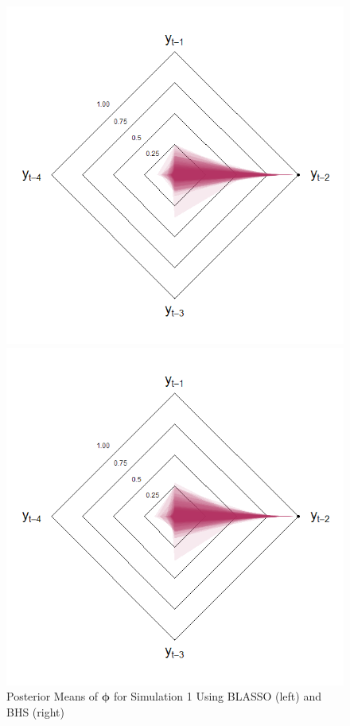 \begin{figure}[!h]
\centering
\caption{Posterior Means of $\bm{\phi}$ for Simulation 1 Using BLASSO (left) and BHS (right)}
\begin{minipage}[h]{0.4\textwidth}
\includegraphics[scale=0.32]{blassodlp}
\end{minipage} \hspace{0.10\textwidth}
\begin{minipage}[h]{0.4\textwidth}
\includegraphics[scale=0.32]{hsdlp}
\end{minipage}
\label{fig:dirichlet1}
\end{figure}


